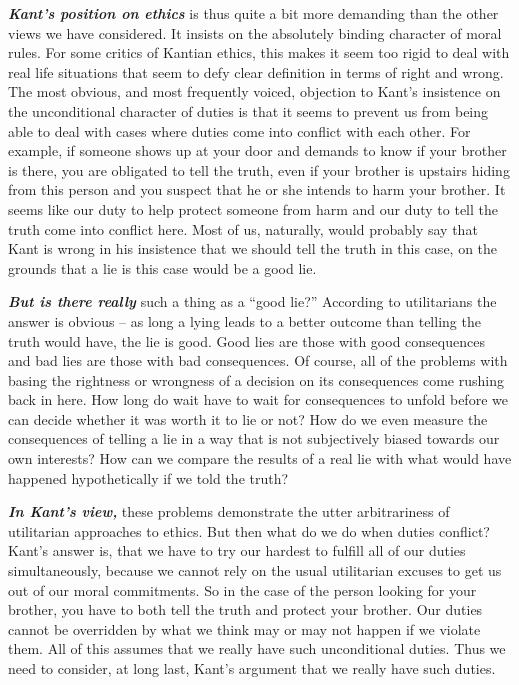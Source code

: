 \documentclass[
  12pt, openany]{book}
\theoremstyle{definition}
\theoremstyle{definition}
\theoremstyle{definition}
\theoremstyle{definition}
\theoremstyle{remark}
\begin{document}
\textbf{\emph{Kant's position on ethics}} is thus quite a bit more demanding than the other views we have considered. It insists on the absolutely binding character of moral rules. For some critics of Kantian ethics, this makes it seem too rigid to deal with real life situations that seem to defy clear definition in terms of right and wrong. The most obvious, and most frequently voiced, objection to Kant's insistence on the unconditional character of duties is that it seems to prevent us from being able to deal with cases where duties come into conflict with each other. For example, if someone shows up at your door and demands to know if your brother is there, you are obligated to tell the truth, even if your brother is upstairs hiding from this person and you suspect that he or she intends to harm your brother. It seems like our duty to help protect someone from harm and our duty to tell the truth come into conflict here. Most of us, naturally, would probably say that Kant is wrong in his insistence that we should tell the truth in this case, on the grounds that a lie is this case would be a good lie.

\textbf{\emph{But is there really}} such a thing as a ``good lie?'' According to utilitarians the answer is obvious -- as long a lying leads to a better outcome than telling the truth would have, the lie is good. Good lies are those with good consequences and bad lies are those with bad consequences. Of course, all of the problems with basing the rightness or wrongness of a decision on its consequences come rushing back in here. How long do wait have to wait for consequences to unfold before we can decide whether it was worth it to lie or not? How do we even measure the consequences of telling a lie in a way that is not subjectively biased towards our own interests? How can we compare the results of a real lie with what would have happened hypothetically if we told the truth?

\textbf{\emph{In Kant's view,}} these problems demonstrate the utter arbitrariness of utilitarian approaches to ethics. But then what do we do when duties conflict? Kant's answer is, that we have to try our hardest to fulfill all of our duties simultaneously, because we cannot rely on the usual utilitarian excuses to get us out of our moral commitments. So in the case of the person looking for your brother, you have to both tell the truth and protect your brother. Our duties cannot be overridden by what we think may or may not happen if we violate them. All of this assumes that we really have such unconditional duties. Thus we need to consider, at long last, Kant's argument that we really have such duties.
\end{document}
